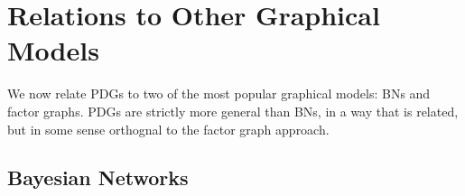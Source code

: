 \documentclass{article}
\theoremstyle{plain}
\theoremstyle{definition}
\theoremstyle{remark}
\numberwithin{equation}{section}
\begin{document}



	\section{Relations to Other Graphical  Models}\label{sec:other-graphical-models}
	We now relate PDGs to two of the most popular graphical
        models: BNs and factor graphs. PDGs are strictly more general
        than BNs, in a way that is related, but 
		in some sense orthognal to
%
	the factor graph approach. 
		
	\subsection{Bayesian Networks} \label{sec:bn-convert}
		
\end{document}
